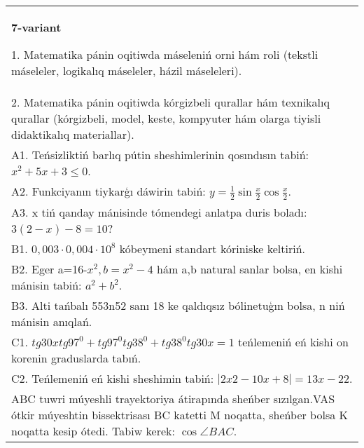 \documentclass{article}
\begin{document}
\begin{tabular}{m{17cm}}
\textbf{7-variant}

1. Matematika pánin oqitiwda máseleniń orni hám roli (tekstli máseleler, logikalıq máseleler, házil máseleleri). \\
2. Matematika pánin oqitiwda kórgizbeli qurallar hám texnikalıq qurallar (kórgizbeli, model, keste, kompyuter hám olarga tiyisli didaktikalıq materiallar). \\
A1. Teńsizliktiń barlıq pútin sheshimlerinin qosındısın tabiń: \(x^2 + 5x + 3 \leq 0\). \\
A2. Funkciyanın tiykarģı dáwirin tabiń: \(y = \frac{1}{2}\sin{\frac{x}{2}\cos\frac{x}{2}}\). \\
A3. x tiń qanday mánisinde tómendegi anlatpa duris boladı: \(3 (2 - x) - 8 = 10\)? \\
B1. \(0,003 \cdot 0,004 \cdot 10^{8}\) kóbeymeni standart kóriniske keltiriń. \\
B2. Eger a=16-\(x^2, b=x^2 - 4\) hám a,b natural sanlar bolsa, en kishi mánisin tabiń: \(a^2 + b^2\). \\
B3. Alti tańbalı 553n52 sanı 18 ke qaldıqsız bólinetuģın bolsa, n niń mánisin anıqlań. \\
C1. \(tg30xtg97^{0} + tg97^{0}tg38^{0} + tg38^{0}tg30x = 1\) teńlemeniń eń kishi on korenin graduslarda tabıń. \\
C2. Teńlemeniń eń kishi sheshimin tabiń: \(\left| 2x2 - 10x + 8 \right| = 13x - 22\). \\
ABC tuwri múyeshli trayektoriya átirapında sheńber sızılgan.VAS ótkir múyeshtin bissektrisası BC katetti M noqatta, sheńber bolsa K noqatta kesip ótedi. Tabiw kerek: \(\cos\angle BAC\). \\

\end{tabular}
\vspace{1cm}
\end{document}
